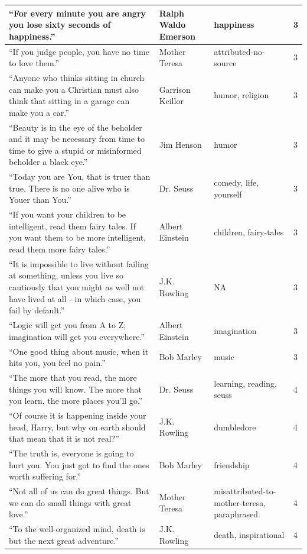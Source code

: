 \documentclass[
  letterpaper,
  DIV=11,
  numbers=noendperiod]{scrreprt}
\begin{document}
\begin{tabular}[t]{l|l|l|l}
\hline
“For every minute you are angry you lose sixty seconds of happiness.” & Ralph Waldo Emerson & happiness & 3\\
\hline
“If you judge people, you have no time to love them.” & Mother Teresa & attributed-no-source & 3\\
\hline
“Anyone who thinks sitting in church can make you a Christian must also think that sitting in a garage can make you a car.” & Garrison Keillor & humor, religion & 3\\
\hline
“Beauty is in the eye of the beholder and it may be necessary from time to time to give a stupid or misinformed beholder a black eye.” & Jim Henson & humor & 3\\
\hline
“Today you are You, that is truer than true. There is no one alive who is Youer than You.” & Dr. Seuss & comedy, life, yourself & 3\\
\hline
“If you want your children to be intelligent, read them fairy tales. If you want them to be more intelligent, read them more fairy tales.” & Albert Einstein & children, fairy-tales & 3\\
\hline
“It is impossible to live without failing at something, unless you live so cautiously that you might as well not have lived at all - in which case, you fail by default.” & J.K. Rowling & NA & 3\\
\hline
“Logic will get you from A to Z; imagination will get you everywhere.” & Albert Einstein & imagination & 3\\
\hline
“One good thing about music, when it hits you, you feel no pain.” & Bob Marley & music & 3\\
\hline
“The more that you read, the more things you will know. The more that you learn, the more places you'll go.” & Dr. Seuss & learning, reading, seuss & 4\\
\hline
“Of course it is happening inside your head, Harry, but why on earth should that mean that it is not real?” & J.K. Rowling & dumbledore & 4\\
\hline
“The truth is, everyone is going to hurt you. You just got to find the ones worth suffering for.” & Bob Marley & friendship & 4\\
\hline
“Not all of us can do great things. But we can do small things with great love.” & Mother Teresa & misattributed-to-mother-teresa, paraphrased & 4\\
\hline
“To the well-organized mind, death is but the next great adventure.” & J.K. Rowling & death, inspirational & 4\\

\end{tabular}
\end{document}
